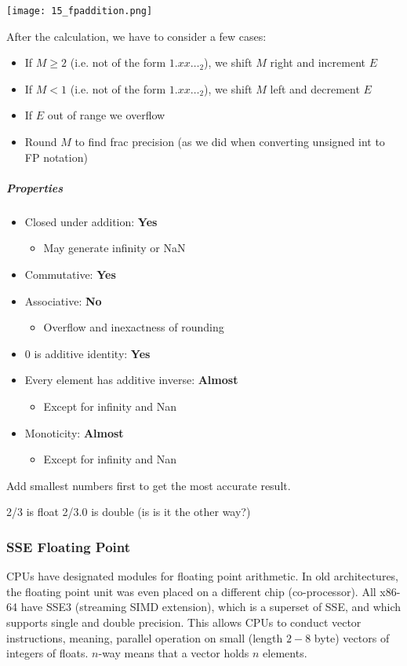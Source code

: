 \texttt{[image: 15\_fpaddition.png]}

After the calculation, we have to consider a few cases:
\begin{itemize}
    \item If $M \ge 2$ (i.e. not of the form $1.xx\dots_2$), we shift $M$ right and increment $E$
    \item If $M <  1$ (i.e. not of the form $1.xx\dots_2$), we shift $M$ left and decrement $E$
    \item If $E$ out of range we overflow
    \item Round $M$ to find frac precision (as we did when converting unsigned int to FP notation)
\end{itemize}

\subparagraph{Properties}
\begin{itemize}
    \item Closed under addition: \textbf{Yes}
        \begin{itemize}
            \item May generate infinity or NaN
        \end{itemize}
    \item Commutative: \textbf{Yes}
    \item Associative: \textbf{No}
        \begin{itemize}
            \item Overflow and inexactness of rounding
        \end{itemize}
    \item $0$ is additive identity: \textbf{Yes}
    \item Every element has additive inverse: \textbf{Almost}
        \begin{itemize}
            \item Except for infinity and Nan
        \end{itemize}
    \item Monoticity: \textbf{Almost}
        \begin{itemize}
            \item Except for infinity and Nan
        \end{itemize}
\end{itemize}

Add smallest numbers first to get the most accurate result.


2/3 is float
2/3.0 is double (is is it the other way?)

\subsubsection{SSE Floating Point}
CPUs have designated modules for floating point arithmetic. In old architectures, the floating point unit was even placed on a different chip (co-processor). All x86-64 have SSE3 (streaming SIMD extension), which is a superset of SSE, and which supports single and double precision. This allows CPUs to conduct vector instructions, meaning, parallel operation on small (length $2-8$ byte) vectors of integers of floats. $n$-way means that a vector holds $n$ elements.

